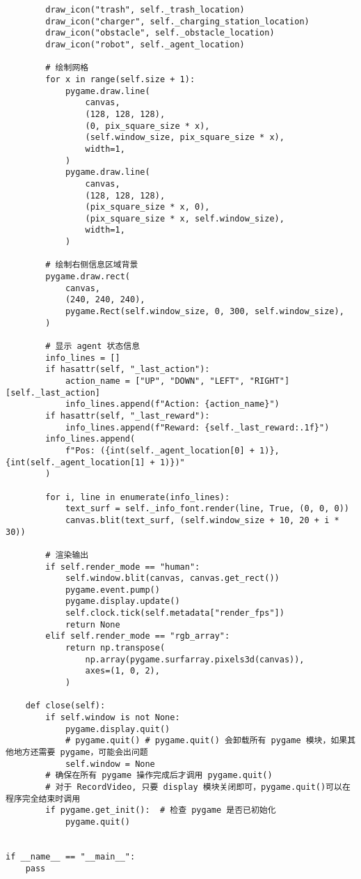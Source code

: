 \begin{verbatim}
        draw_icon("trash", self._trash_location)
        draw_icon("charger", self._charging_station_location)
        draw_icon("obstacle", self._obstacle_location)
        draw_icon("robot", self._agent_location)

        # 绘制网格
        for x in range(self.size + 1):
            pygame.draw.line(
                canvas,
                (128, 128, 128),
                (0, pix_square_size * x),
                (self.window_size, pix_square_size * x),
                width=1,
            )
            pygame.draw.line(
                canvas,
                (128, 128, 128),
                (pix_square_size * x, 0),
                (pix_square_size * x, self.window_size),
                width=1,
            )

        # 绘制右侧信息区域背景
        pygame.draw.rect(
            canvas,
            (240, 240, 240),
            pygame.Rect(self.window_size, 0, 300, self.window_size),
        )

        # 显示 agent 状态信息
        info_lines = []
        if hasattr(self, "_last_action"):
            action_name = ["UP", "DOWN", "LEFT", "RIGHT"][self._last_action]
            info_lines.append(f"Action: {action_name}")
        if hasattr(self, "_last_reward"):
            info_lines.append(f"Reward: {self._last_reward:.1f}")
        info_lines.append(
            f"Pos: ({int(self._agent_location[0] + 1)}, {int(self._agent_location[1] + 1)})"
        )

        for i, line in enumerate(info_lines):
            text_surf = self._info_font.render(line, True, (0, 0, 0))
            canvas.blit(text_surf, (self.window_size + 10, 20 + i * 30))

        # 渲染输出
        if self.render_mode == "human":
            self.window.blit(canvas, canvas.get_rect())
            pygame.event.pump()
            pygame.display.update()
            self.clock.tick(self.metadata["render_fps"])
            return None
        elif self.render_mode == "rgb_array":
            return np.transpose(
                np.array(pygame.surfarray.pixels3d(canvas)),
                axes=(1, 0, 2),
            )

    def close(self):
        if self.window is not None:
            pygame.display.quit()
            # pygame.quit() # pygame.quit() 会卸载所有 pygame 模块，如果其他地方还需要 pygame，可能会出问题
            self.window = None
        # 确保在所有 pygame 操作完成后才调用 pygame.quit()
        # 对于 RecordVideo, 只要 display 模块关闭即可，pygame.quit()可以在程序完全结束时调用
        if pygame.get_init():  # 检查 pygame 是否已初始化
            pygame.quit()


if __name__ == "__main__":
    pass

\end{verbatim}
